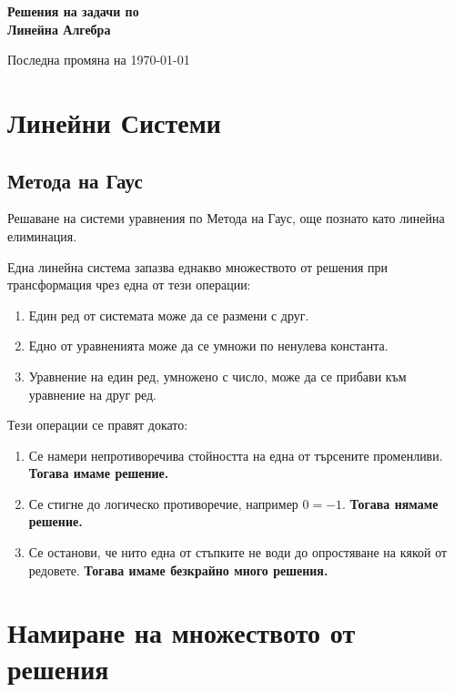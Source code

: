 \documentclass[12pt]{article}
\begin{document}
\begin{titlepage}
    \begin{center}
        \huge
        \textbf{Решения на задачи по \\ Линейна Алгебра}

        \large \vfill
        Последна промяна на \today
    \end{center}
\end{titlepage}
\newpage

\tableofcontents
\newpage

\section{Линейни Системи}

\subsection{Метода на Гаус}

\noindent Решаване на системи уравнения по Метода на Гаус, още познато като линейна елиминация.

\noindent Една линейна система запазва еднакво множеството от решения при трансформация чрез една от тези операции:
\begin{enumerate}
    \item Един ред от системата може да се размени с друг.
    \item Едно от уравненията може да се умножи по ненулева константа.
    \item Уравнение на един ред, умножено с число, може да се прибави към уравнение на друг ред.
\end{enumerate}

\noindent Тези операции се правят докато:
\begin{enumerate}
    \item Се намери непротиворечива стойността на една от търсените променливи. \textbf{Тогава имаме решение.}
    \item Се стигне до логическо противоречие, например $0=-1$. \textbf{Тогава нямаме решение.}
    \item Се останови, че нито една от стъпките не води до опростяване на кякой от редовете. \textbf{Тогава имаме безкрайно много решения.}
\end{enumerate}










\section{Намиране на множеството от решения}





\end{document}
